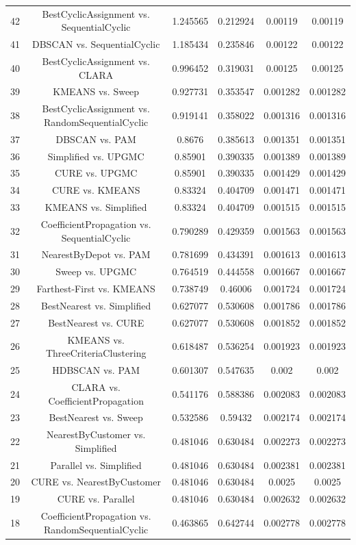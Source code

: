 \documentclass[a4paper,10pt]{article}
\begin{document}
\begin{landscape}
\begin{table}[!htp]
\begin{tabular}{cccccc}
42&BestCyclicAssignment vs. SequentialCyclic&1.245565&0.212924&0.00119&0.00119\\
41&DBSCAN vs. SequentialCyclic&1.185434&0.235846&0.00122&0.00122\\
40&BestCyclicAssignment vs. CLARA&0.996452&0.319031&0.00125&0.00125\\
39&KMEANS vs. Sweep&0.927731&0.353547&0.001282&0.001282\\
38&BestCyclicAssignment vs. RandomSequentialCyclic&0.919141&0.358022&0.001316&0.001316\\
37&DBSCAN vs. PAM&0.8676&0.385613&0.001351&0.001351\\
36&Simplified vs. UPGMC&0.85901&0.390335&0.001389&0.001389\\
35&CURE vs. UPGMC&0.85901&0.390335&0.001429&0.001429\\
34&CURE vs. KMEANS&0.83324&0.404709&0.001471&0.001471\\
33&KMEANS vs. Simplified&0.83324&0.404709&0.001515&0.001515\\
32&CoefficientPropagation vs. SequentialCyclic&0.790289&0.429359&0.001563&0.001563\\
31&NearestByDepot vs. PAM&0.781699&0.434391&0.001613&0.001613\\
30&Sweep vs. UPGMC&0.764519&0.444558&0.001667&0.001667\\
29&Farthest-First vs. KMEANS&0.738749&0.46006&0.001724&0.001724\\
28&BestNearest vs. Simplified&0.627077&0.530608&0.001786&0.001786\\
27&BestNearest vs. CURE&0.627077&0.530608&0.001852&0.001852\\
26&KMEANS vs. ThreeCriteriaClustering&0.618487&0.536254&0.001923&0.001923\\
25&HDBSCAN vs. PAM&0.601307&0.547635&0.002&0.002\\
24&CLARA vs. CoefficientPropagation&0.541176&0.588386&0.002083&0.002083\\
23&BestNearest vs. Sweep&0.532586&0.59432&0.002174&0.002174\\
22&NearestByCustomer vs. Simplified&0.481046&0.630484&0.002273&0.002273\\
21&Parallel vs. Simplified&0.481046&0.630484&0.002381&0.002381\\
20&CURE vs. NearestByCustomer&0.481046&0.630484&0.0025&0.0025\\
19&CURE vs. Parallel&0.481046&0.630484&0.002632&0.002632\\
18&CoefficientPropagation vs. RandomSequentialCyclic&0.463865&0.642744&0.002778&0.002778\\

\end{tabular}
\end{table}
\end{landscape}
\end{document}

